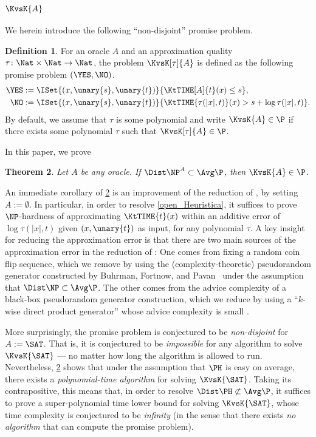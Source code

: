\documentclass[11pt]{article}
\numberwithin{equation}{section}
\newtheorem{theorem}{Theorem}[section]
\theoremstyle{definition}
\newtheorem{definition}[theorem]{Definition}
\theoremstyle{plain}
\begin{document}
\subsubsection{\texorpdfstring{$\KvsK{A}$}{Gap(K(A) vs K)}}
We herein introduce the following ``non-disjoint'' promise problem.
%
%
%
%

\begin{definition}
  For
  an oracle $A$ and an approximation quality $\tau \colon \Nat \times \Nat \to \Nat$,
  the problem $\KvsK[\tau]{A}$ %
  is defined as the following promise problem $(\YES, \NO)$.
  \begin{align*}
    \YES & := \ISet{ (x, \unary{s}, \unary{t}) } { \KtTIME[A]{t}(x) \le s },
    \\
    \NO  & := \ISet{ (x, \unary{s}, \unary{t}) } { \KtTIME{\tau(|x|, t)}(x) > s + \log \tau(|x|, t) }.
  \end{align*}
  By default, we assume that $\tau$ is some polynomial
  and write $\KvsK{A} \in \P$ if
  there exists some polynomial $\tau$ such that
  $\KvsK[\tau]{A} \in \P$.
\end{definition}

In this paper, we prove
%
\begin{theorem}
  \label{thm_HeuristicaIntro}
  Let $A$ be any oracle.
  If $\Dist\NP^A \subset \Avg\P$,
  then
  $\KvsK{A} \in \P$.
\end{theorem}

An immediate corollary of \cref{thm_HeuristicaIntro} is an improvement of the reduction of \cite{Hirahara18_focs_conf}, by setting $A := \emptyset$.
In particular, in order to resolve \cref{open_Heuristica},
it suffices to prove $\NP$-hardness of approximating $\KtTIME{t}(x)$ within an additive error of $\log \tau(|x|, t)$ given $(x, \unary{t})$ as input, for any polynomial $\tau$.
A key insight for reducing the approximation error is
that there are two main sources of the approximation error in the reduction of \cite{Hirahara18_focs_conf}:
One comes from fixing a random coin flip sequence,
which we remove by using the (complexity-theoretic) pseudorandom generator
constructed by
Buhrman, Fortnow, and Pavan~\cite{BuhrmanFP05_mst_journals}
under the assumption that $\Dist\NP \subset \Avg\P$.
The other comes from
the advice complexity of a black-box pseudorandom generator construction,
which we reduce by using
a ``$k$-wise direct product generator''
whose advice complexity is small \cite{Hirahara20_stoc_conf}.
%
%
%

More surprisingly,
the promise problem is conjectured to be \emph{non-disjoint} for $A := \SAT$.
That is, it is conjectured to be \emph{impossible} for any algorithm to solve $\KvsK{\SAT}$ --- no matter how long the algorithm is allowed to run.
Nevertheless,
\cref{thm_HeuristicaIntro}
shows that
under the assumption that $\PH$ is easy on average,
there exists a \emph{polynomial-time algorithm} for solving $\KvsK{\SAT}$.
Taking its contrapositive,
this means that,
in order to resolve $\Dist\PH \not\subset \Avg\P$,
it suffices to prove a super-polynomial time lower bound
for solving $\KvsK{\SAT}$,
whose time complexity is conjectured to be \emph{infinity} (in the sense that there exists \emph{no algorithm} that can compute the promise problem).
\end{document}
